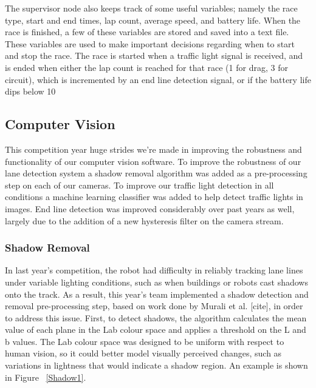 \documentclass[11pt,journal]{IEEEtran}
\begin{document}
The supervisor node also keeps track of some useful variables; namely the race type, start and end times, lap count, average speed, and battery life. When the race is finished, a few of these variables are stored and saved into a text file. These variables are used to make important decisions regarding when to start and stop the race. The race is started when a traffic light signal is received, and is ended when either the lap count is reached for that race (1 for drag, 3 for circuit), which is incremented by an end line detection signal, or if the battery life dips below 10%

\subsection{Computer Vision}
This competition year huge strides we're made in improving the robustness and functionality of our computer vision software. To improve the robustness of our lane detection system a shadow removal algorithm was added as a pre-processing step on each of our cameras. To improve our traffic light detection in all conditions a machine learning classifier was added to help detect traffic lights in images. End line detection was improved considerably over past years as well, largely due to the addition of a new hysteresis filter on the camera stream. 

\subsubsection{Shadow Removal}
In last year's competition, the robot had difficulty in reliably tracking lane lines under variable lighting conditions, such as when buildings or robots cast shadows onto the track. As a result, this year's team implemented a shadow detection and removal pre-processing step, based on work done by Murali et al. [cite], in order to address this issue.
First, to detect shadows, the algorithm calculates the mean value of each plane in the Lab colour space and applies a threshold on the L and b values. The Lab colour space was designed to be uniform with respect to human vision, so it could better model visually perceived changes, such as variations in lightness that would indicate a shadow region. An example is shown in Figure ~\ref{Shadow1}.
\end{document}
